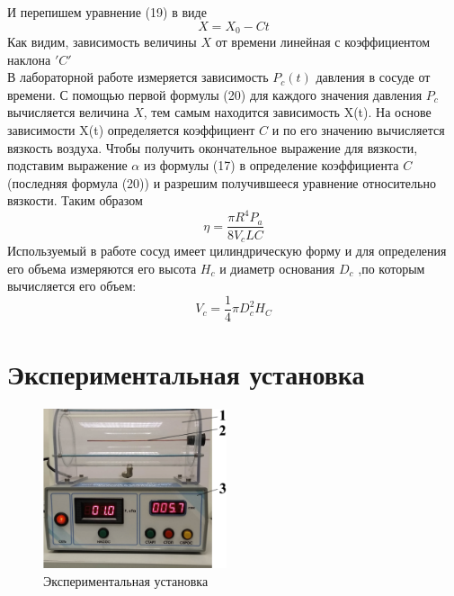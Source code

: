 \documentclass[a4paper]{article}
\begin{document}
И перепишем уравнение (19) в виде
\begin{equation}
X = X_0 - Ct
\end{equation}
Как видим, зависимость величины $X$ от времени линейная с коэффициентом наклона $'C'$\\
В лабораторной работе измеряется зависимость $P_c(t)$ давления в сосуде от времени. С помощью первой формулы (20) для
каждого значения давления $P_c$ вычисляется величина $X$, тем самым находится зависимость X(t). На основе зависимости X(t)
определяется коэффициент $C$ и по его значению вычисляется
вязкость воздуха. Чтобы получить окончательное выражение для
вязкости, подставим выражение $\alpha$ из формулы (17) в определение коэффициента $C$ (последняя формула (20)) и разрешим
получившееся уравнение относительно вязкости. Таким образом
\begin{equation}
    \eta = \dfrac{\pi R^4 P_a}{8V_cLC}
\end{equation}
Используемый в работе сосуд имеет цилиндрическую форму
и для определения его объема измеряются его высота $H_c$ и диаметр основания $D_c$ ,по которым вычисляется его объем:
\begin{equation}
    V_c = \dfrac{1}{4}\pi D_c^2H_C
\end{equation}



\section{Экспериментальная установка}
\begin{figure}[H]
    \begin{center}
    \includegraphics[width=0.48\textwidth]{pick_4}
    \caption{Экспериментальная установка}
\end{center}
\end{figure}
\end{document}
